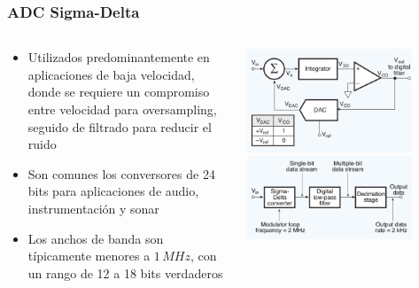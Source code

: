 \documentclass{beamer}
\begin{document}
\begin{frame}
\frametitle{ADC Sigma-Delta}
  \begin{columns}
    \begin{column}{0.55\textwidth}
      \begin{exampleblock}{}
        \begin{itemize}
          \item  Utilizados predominantemente en aplicaciones de baja velocidad,
donde se requiere un compromiso entre velocidad para oversampling, seguido de
filtrado para reducir el ruido
          \item  Son comunes los conversores de 24 bits para aplicaciones de
audio, instrumentación y sonar
          \item  Los anchos de banda son típicamente menores a $1\,MHz$, con un
rango de 12 a 18 bits verdaderos
        \end{itemize}
      \end{exampleblock}
    \end{column} 
    \begin{column}{0.45\textwidth}
  \begin{center}
      \includegraphics[width=0.8\textwidth]{d3/adc_sigma_delta} \\
      \vspace{5mm}
      \includegraphics[width=0.8\textwidth]{d3/sigma_delta_w_filter}
  \end{center}
    \end{column}
  \end{columns}
\end{frame}
\end{document}
